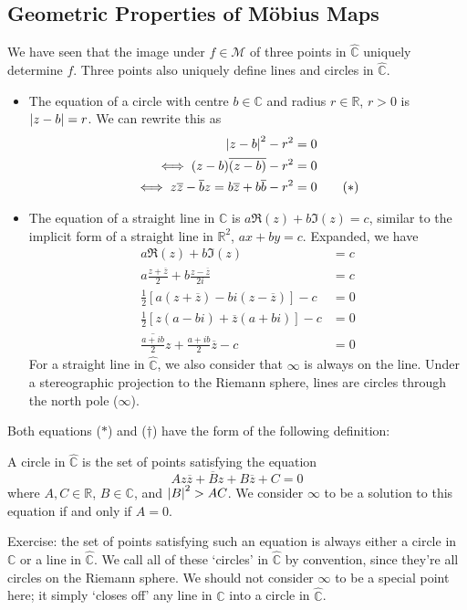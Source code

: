 \subsection{Geometric Properties of M\"obius Maps}
We have seen that the image under $f \in \mathcal M$ of three points in $\hat{\mathbb C}$ uniquely determine $f$. Three points also uniquely define lines and circles in $\hat{\mathbb C}$.
\begin{itemize}
	\item The equation of a circle with centre $b \in \mathbb C$ and radius $r \in \mathbb R$, $r > 0$ is $\abs{z-b} = r$. We can rewrite this as
	      \begin{align*}
		      \abs{z-b}^2 - r^2                                                        & = 0              \\
		      \iff (z-b)\overline{(z-b)} - r^2                                         & = 0              \\
		      \iff z\overline{z} - \overline{b}z = b\overline{z} + b\overline{b} - r^2 & = 0 \tag{$\ast$}
	      \end{align*}
	\item The equation of a straight line in $\mathbb C$ is $a \Re(z) + b \Im(z) = c$, similar to the implicit form of a straight line in $\mathbb R^2$, $ax+by=c$. Expanded, we have
	      \begin{align*}
		      a \Re(z) + b \Im(z)                                                      & = c                 \\
		      a \frac{z + \overline z}{2} + b \frac{z - \overline z}{2i}               & = c                 \\
		      \frac{1}{2}\left[ a (z + \overline z) - bi (z - \overline z) \right] - c & = 0                 \\
		      \frac{1}{2}\left[ z(a-bi) + \overline z(a+bi) \right] - c                & = 0                 \\
		      \overline{\frac{a + ib}{2}}z + \frac{a+ib}{2}\overline{z} - c            & = 0 \tag{$\dagger$}
	      \end{align*}
	      For a straight line in $\hat{\mathbb C}$, we also consider that $\infty$ is always on the line. Under a stereographic projection to the Riemann sphere, lines are circles through the north pole ($\infty$).
\end{itemize}
Both equations ($\ast$) and ($\dagger$) have the form of the following definition:
\begin{definition}
	A circle in $\hat{\mathbb C}$ is the set of points satisfying the equation
	\[ Az\overline z + \overline B z + B \overline z + C = 0 \]
	where $A, C \in \mathbb R$, $B \in \mathbb C$, and $\abs{B}^2 > AC$. We consider $\infty$ to be a solution to this equation if and only if $A = 0$.
\end{definition}
Exercise: the set of points satisfying such an equation is always either a circle in $\mathbb C$ or a line in $\hat{\mathbb C}$. We call all of these `circles' in $\hat{\mathbb C}$ by convention, since they're all circles on the Riemann sphere. We should not consider $\infty$ to be a special point here; it simply `closes off' any line in $\mathbb C$ into a circle in $\hat{\mathbb C}$.

